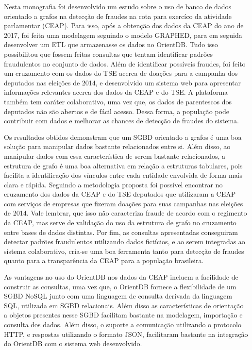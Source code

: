 Nesta monografia foi desenvolvido um estudo sobre o uso de banco de dados orientado a grafos na detecção de fraudes na cota para exercíco da atividade parlamentar (CEAP). Para isso, após a obtenção dos dados da CEAP do ano de 2017, foi feita uma modelagem seguindo o modelo GRAPHED, para em seguida desenvolver um ETL que armazenasse os dados no OrientDB. Tudo isso possibilitou que fossem feitas consultas que tentam identificar padrões fraudulentos no conjunto de dados. Além de identificar possíveis fraudes, foi feito um cruzamento com os dados do TSE acerca de doações para a campanha dos deputados nas eleições de 2014, e desenvolvido um sistema web para apresentar informações relevantes acerca dos dados da CEAP e do TSE. A plataforma também tem caráter colaborativo, uma vez que, os dados de parentescos dos deputados não são abertos e de fácil acesso. Dessa forma, a população pode contribuir com dados e melhorar as chances de detecção de fraudes do sistema.

Os resultados obtidos demonstram que um SGBD orientado a grafos é uma boa solução para manipular dados bastante relacionados entre si. Além disso, ao manipular dados com essa característica de serem bastante relacionados, a estrutura de grafo é uma boa alternativa em relação a estruturas tabulares, pois facilita a identificação dos vínculos entre cada entidade envolvida de forma mais clara e rápida. Seguindo a metodologia proposta foi possível encontrar no cruzamento dos dados da CEAP e do TSE deputados que utilizaram a CEAP com serviços de empresas que fizeram doações para suas campanhas nas eleições de 2014. Vale lembrar, que isso não caracteriza fraude de acordo com o regimento da CEAP, mas serve de validação do uso da estrutura de grafo no cruzamento entre bases de dados distintas. Por fim, as consultas apresentadas conseguiram detectar padrões fraudulentos utilizando dados fictícios, e ao serem integradas ao sistema colaborativo, cria-se uma boa ferramenta tanto para detecção de fraudes quanto para a transparência da CEAP para a população brasileira.

As vantagens no uso do OrientDB nos dados da CEAP incluem a facilidade de construir as consultas, uma vez que, o OrientDB fornece a flexibilidade de um SGBD NoSQL junto com uma linguagem de consulta derivada da linguagem SQL, utilizada em SGBD relacionais. Além disso as características de orientação a objetos presentes nesse SGBD facilitam bastante na modelagem, importação e consulta dos dados. Além disso, o suporte a comunicação utilizando o protocolo HTTP, e respostas utilizando o formato JSON, facilitaram bastante na integração do OrientDB com o sistema web desenvolvido.

